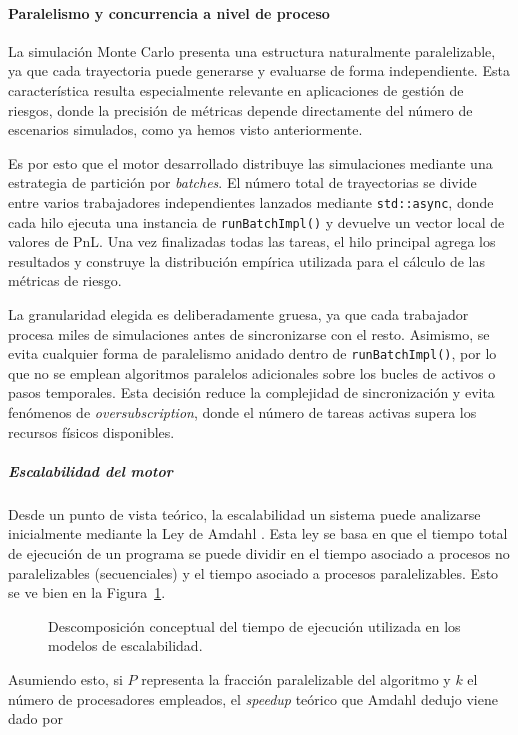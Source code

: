 \documentclass[11pt]{article}
\begin{document}
\paragraph{Paralelismo y concurrencia a nivel de proceso}

La simulación Monte Carlo presenta una estructura naturalmente paralelizable, ya que cada trayectoria puede generarse y evaluarse de forma independiente. Esta característica resulta especialmente relevante en aplicaciones de gestión de riesgos, donde la precisión de métricas depende directamente del número de escenarios simulados, como ya hemos visto anteriormente.

Es por esto que el motor desarrollado distribuye las simulaciones mediante una estrategia de partición por \emph{batches}. El número total de trayectorias se divide entre varios trabajadores independientes lanzados mediante \texttt{std::async}, donde cada hilo ejecuta una instancia de \texttt{runBatchImpl()} y devuelve un vector local de valores de PnL. Una vez finalizadas todas las tareas, el hilo principal agrega los resultados y construye la distribución empírica utilizada para el cálculo de las métricas de riesgo.

La granularidad elegida es deliberadamente gruesa, ya que cada trabajador procesa miles de simulaciones antes de sincronizarse con el resto. Asimismo, se evita cualquier forma de paralelismo anidado dentro de \texttt{runBatchImpl()}, por lo que no se emplean algoritmos paralelos adicionales sobre los bucles de activos o pasos temporales. Esta decisión reduce la complejidad de sincronización y evita fenómenos de \emph{oversubscription}, donde el número de tareas activas supera los recursos físicos disponibles.

\subparagraph{Escalabilidad del motor}
Desde un punto de vista teórico, la escalabilidad un sistema puede analizarse inicialmente mediante la Ley de Amdahl \cite{amdahl1967validity}. Esta ley se basa en que el tiempo total de ejecución de un programa se puede dividir en el tiempo asociado a procesos no paralelizables (secuenciales) y el tiempo asociado a procesos paralelizables. Esto se ve bien en la Figura~\ref{fig:amdahl_montecarlo}.

\begin{figure}[H]
\centering
{}
\caption{Descomposición conceptual del tiempo de ejecución utilizada en los modelos de escalabilidad.}
\label{fig:amdahl_montecarlo}
\end{figure}
Asumiendo esto, si \(P\) representa la fracción paralelizable del algoritmo y \(k\) el número de procesadores empleados, el \emph{speedup} teórico que Amdahl dedujo viene dado por
\end{document}
